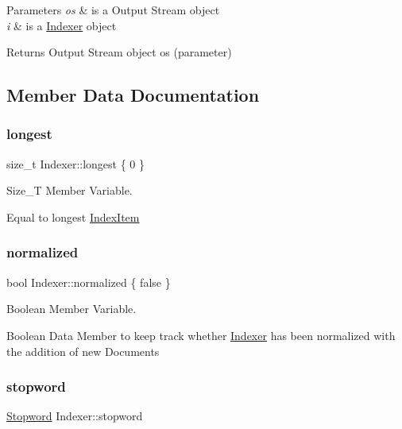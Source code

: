 \begin{DoxyParams}{Parameters}
{\em os} & is a Output Stream object \\
\hline
{\em i} & is a \hyperlink{class_indexer}{Indexer} object \\
\hline
\end{DoxyParams}
\begin{DoxyReturn}{Returns}
Output Stream object os (parameter) 
\end{DoxyReturn}


\subsection{Member Data Documentation}
\mbox{\label{class_indexer_a605caf73d13945418d628d740468d86d}} 
\subsubsection{\texorpdfstring{longest}{longest}}
{\footnotesize\ttfamily size\+\_\+t Indexer\+::longest \{ 0 \}\hspace{0.3cm}{\ttfamily [protected]}}



Size\+\_\+T Member Variable. 

Equal to longest \hyperlink{class_index_item}{Index\+Item} \mbox{\label{class_indexer_a1345c9d490613f7b3a823ade15d7f68c}} 
\subsubsection{\texorpdfstring{normalized}{normalized}}
{\footnotesize\ttfamily bool Indexer\+::normalized \{ false \}\hspace{0.3cm}{\ttfamily [protected]}}



Boolean Member Variable. 

Boolean Data Member to keep track whether \hyperlink{class_indexer}{Indexer} has been normalized with the addition of new Documents \mbox{\label{class_indexer_af6f4a98f2cd0bb95f22203902ed2349d}} 
\subsubsection{\texorpdfstring{stopword}{stopword}}
{\footnotesize\ttfamily \hyperlink{class_stopword}{Stopword} Indexer\+::stopword\hspace{0.3cm}{\ttfamily [protected]}}



